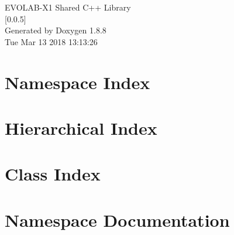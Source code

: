 \documentclass[twoside]{book}
\newcommand{\+}{\discretionary{\mbox{\scriptsize$\hookleftarrow$}}{}{}}
\newcommand{\clearemptydoublepage}{%
  \newpage{\pagestyle{empty}\cleardoublepage}%
}
\begin{document}
\hypersetup{pageanchor=false,
             bookmarks=true,
             bookmarksnumbered=true,
             pdfencoding=unicode
            }
\begin{titlepage}
\vspace*{7cm}
\begin{center}%
{\Large E\+V\+O\+L\+A\+B-\/\+X1 Shared C++ Library \\[1ex]\large \mbox{[}0.\+0.\+5\mbox{]} }\\
\vspace*{1cm}
{\large Generated by Doxygen 1.8.8}\\
\vspace*{0.5cm}
{\small Tue Mar 13 2018 13:13:26}\\
\end{center}
\end{titlepage}
\clearemptydoublepage
\tableofcontents
\clearemptydoublepage
{}
\hypersetup{pageanchor=true}

\chapter{Namespace Index}

\chapter{Hierarchical Index}

\chapter{Class Index}

\chapter{Namespace Documentation}

\end{document}
